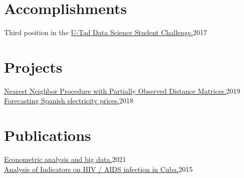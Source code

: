 \documentclass{muratcan_cv}
\begin{document}
\section{Accomplishments}
 \datedexperience
 	{Third position in the  	\href{https://www.u-tad.com/alumnos-del-grado-ingenieria-software-u-tad-ganan-datathon-microsoft-espana/}{U-Tad Data Science Student Challenge.}}{2017}
%

\section{Projects} 
\datedexperience
	{\href{https://github.com/aldofranco91/TFM_Ing_Mat/blob/master/!!Tesis/Aldo_TFM.pdf}{Nearest Neighbor Procedure with Partially Observed Distance Matrices.}}{2019} 
	 \\
%
\datedexperience
	{\href{https://github.com/aldofranco91/TFM_Big_Data/blob/master/!!Tesis/Aldo_TFM.pdf}{Forecasting Spanish electricity prices.}}{2018} 

\section{Publications}
\datedexperience
{\href{https://www.funcas.es/wp-content/uploads/2021/06/An\%C3\%A1lisis-econom\%C3\%A9trico-y-big-data.pdf}{Econometric analysis and big data.}}{2021} \\
%
\datedexperience
{\href{https://1library.co/document/y4x1l85z-encuesta-indicadores-prevencion-infeccion-vih-sida.html}{Analysis of Indicators on HIV / AIDS infection in Cuba.}}{2015} 

\end{document}
